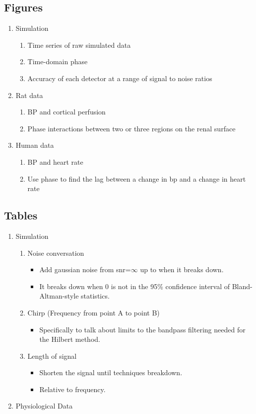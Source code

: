 \documentclass{article}
\begin{document}
	\subsection*{Figures}
	\begin{enumerate}
	\item Simulation
		\begin{enumerate}
		\item Time series of raw simulated data
		\item Time-domain phase 
		\item Accuracy of each detector at a range of signal to noise ratios
		\end{enumerate}
	\item Rat data
		\begin{enumerate}
		\item BP and cortical perfusion
		\item Phase interactions between two or three regions on the renal surface
		\end{enumerate}
	\item{Human data}
		\begin{enumerate}
		\item BP and heart rate
		\item Use phase to find the lag between a change in bp and a change in heart rate
		\end{enumerate}
	\end{enumerate}
	
	\subsection*{Tables}
		\begin{enumerate}
			\item Simulation
			\begin{enumerate}
			\item Noise conversation
				\begin{itemize}
					\item Add gaussian noise from snr=$\infty$ up to when it breaks down.
					\item It breaks down when 0 is not in the 95\% confidence interval of Bland-Altman-style statistics.		
				\end{itemize}
			\item Chirp (Frequency from point A to point B)
				\begin{itemize}
					\item Specifically to talk about limits to the bandpass filtering needed for the Hilbert method.
				\end{itemize}
			\item Length of signal
				\begin{itemize}
					\item Shorten the signal until techniques breakdown.
					\item Relative to frequency.
				\end{itemize}		
			\end{enumerate}
			\item Physiological Data
				
		\end{enumerate}
		


\end{document}
